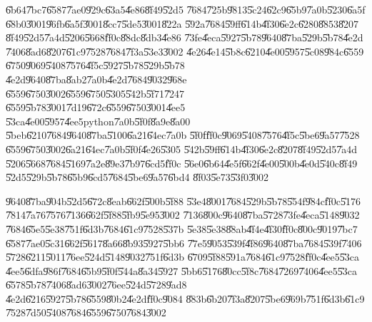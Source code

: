 \documentclass[12pt,a4paper]{article}
\begin{document}
\bigskip

\U{6b64}\U{7bc7}\U{6587}\U{7ae0}\U{929c}\U{63a5}\U{4e86}\U{8f49}\U{52d5}%
\U{7684}\U{725b}\U{9813}\U{5c24}\U{62c9}\U{65b9}\U{7a0b}\U{5230}\U{6a5f}%
\U{68b0}\U{3001}\U{96fb}\U{6a5f}\U{3001}\U{8cc7}\U{5de5}\U{3001}\U{822a}%
\U{592a}\U{7684}\U{59ff}\U{614b}\U{4f30}\U{6e2c}\U{6280}\U{8853}\U{8207}%
\U{8f49}\U{52d5}\U{7a4d}\U{5206}\U{5668}\U{ff0c}\U{88dc}\U{8db3}\U{4e86}%
\U{73fe}\U{4eca}\U{5927}\U{5b78}\U{9640}\U{87ba}\U{529b}\U{5b78}\U{4e2d}%
\U{7406}\U{8ad6}\U{8207}\U{61c9}\U{7528}\U{7684}\U{7f3a}\U{53e3}\U{3002}%
\U{4e26}\U{4e14}\U{5b8c}\U{6210}\U{4e00}\U{5957}\U{5c08}\U{984c}\U{6559}%
\U{6750}\U{9069}\U{5408}\U{7576}\U{4f5c}\U{5927}\U{5b78}\U{529b}\U{5b78}%
\U{4e2d}\U{9640}\U{87ba}\U{8ab2}\U{7a0b}\U{4e2d}\U{7684}\U{9032}\U{968e}%
\U{6559}\U{6750}\U{3002}\U{6559}\U{6750}\U{5305}\U{542b}\U{5f71}\U{7247}%
\U{6559}\U{5b78}\U{3001}\U{7d19}\U{672c}\U{6559}\U{6750}\U{3001}\U{4ee5}%
\U{53ca}\U{4e00}\U{5957}\U{4ee5}python\U{7a0b}\U{5f0f}\U{8a9e}\U{8a00}%
\U{5beb}\U{6210}\U{7684}\U{9640}\U{87ba}\U{5100}\U{6a21}\U{64ec}\U{7a0b}%
\U{5f0f}\U{ff0c}\U{9069}\U{5408}\U{7576}\U{4f5c}\U{5be6}\U{9a57}\U{7528}%
\U{6559}\U{6750}\U{3002}\U{6a21}\U{64ec}\U{7a0b}\U{5f0f}\U{4e26}\U{5305}%
\U{542b}\U{59ff}\U{614b}\U{4f30}\U{6e2c}\U{8207}\U{8f49}\U{52d5}\U{7a4d}%
\U{5206}\U{5668}\U{7684}\U{5169}\U{7a2e}\U{89e3}\U{7b97}\U{6cd5}\U{ff0c}%
\U{56e0}\U{6b64}\U{4e5f}\U{662f}\U{4e00}\U{500b}\U{4e0d}\U{540c}\U{8f49}%
\U{52d5}\U{529b}\U{5b78}\U{65b9}\U{6cd5}\U{7684}\U{5be6}\U{9a57}\U{6bd4}%
\U{8f03}\U{5e73}\U{53f0}\U{3002}

\bigskip

\U{9640}\U{87ba}\U{904b}\U{52d5}\U{672c}\U{8eab}\U{662f}\U{500b}\U{5f88}%
\U{53e4}\U{8001}\U{7684}\U{529b}\U{5b78}\U{554f}\U{984c}\U{ff0c}\U{5176}%
\U{7814}\U{7a76}\U{7576}\U{7136}\U{662f}\U{5f88}\U{5fb9}\U{5e95}\U{3002}%
\U{7136}\U{800c}\U{9640}\U{87ba}\U{5728}\U{73fe}\U{4eca}\U{5148}\U{9032}%
\U{7684}\U{65e5}\U{5e38}\U{751f}\U{6d3b}\U{7684}\U{61c9}\U{7528}\U{537b}%
\U{5e38}\U{5e38}\U{88ab}\U{4f4e}\U{4f30}\U{ff0c}\U{800c}\U{9019}\U{7bc7}%
\U{6587}\U{7ae0}\U{5c31}\U{662f}\U{5617}\U{8a66}\U{8b93}\U{5927}\U{5bb6}%
\U{77e5}\U{9053}\U{539f}\U{4f86}\U{9640}\U{87ba}\U{7684}\U{539f}\U{7406}%
\U{5728}\U{6211}\U{5011}\U{76ee}\U{524d}\U{5148}\U{9032}\U{751f}\U{6d3b}%
\U{6709}\U{5f88}\U{591a}\U{7684}\U{61c9}\U{7528}\U{ff0c}\U{4ee5}\U{53ca}%
\U{4ee5}\U{6dfa}\U{986f}\U{7684}\U{65b9}\U{5f0f}\U{544a}\U{8a34}\U{5927}%
\U{5bb6}\U{5176}\U{80cc}\U{5f8c}\U{7684}\U{7269}\U{7406}\U{4ee5}\U{53ca}%
\U{6578}\U{5b78}\U{7406}\U{8ad6}\U{3002}\U{76ee}\U{524d}\U{5728}\U{9ad8}%
\U{4e2d}\U{6216}\U{5927}\U{5b78}\U{6559}\U{80b2}\U{4e2d}\U{ff0c}\U{9084}%
\U{883b}\U{6b20}\U{7f3a}\U{8207}\U{5be6}\U{969b}\U{751f}\U{6d3b}\U{61c9}%
\U{7528}\U{7d50}\U{5408}\U{7684}\U{6559}\U{6750}\U{7684}\U{3002}
\end{document}
